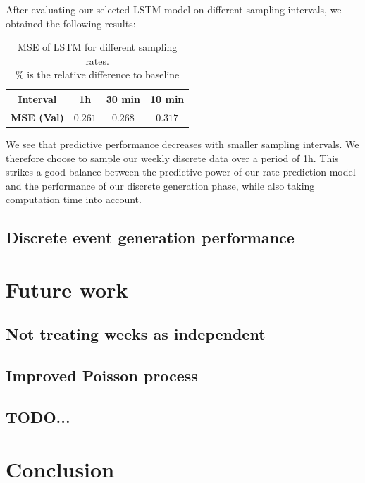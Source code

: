 \documentclass[10pt,conference,compsocconf]{IEEEtran}
\begin{document}
After evaluating our selected LSTM model on different sampling intervals, we obtained the following results:

\begin{table}[h!]
\begin{center}
\begin{tabular}{| c| c c c | }
\hline
 \textbf{Interval}   & 1h & 30 min & 10 min \\
 \hline
 \textbf{MSE (Val)} & $0.261$ & $0.268$ & $0.317$ \\
 \hline
\end{tabular}
\end{center}
\label{table:sampling}
\caption{MSE of LSTM for different sampling rates.\\
{\footnotesize \% is the relative difference to baseline}}
\end{table}

We see that predictive performance decreases with smaller sampling intervals. We therefore choose to sample our
weekly discrete data over a period of 1h. This strikes a good balance between the predictive power of our rate
prediction model and the performance of our discrete generation phase, while also taking computation time into account. 

\subsection{Discrete event generation performance}


\section{Future work}

\subsection{Not treating weeks as independent}

\subsection{Improved Poisson process}

\subsection{TODO...}



\section{Conclusion}






\end{document}
